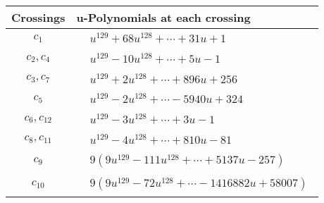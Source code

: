 \documentclass[1p]{elsarticle_modified}
\theoremstyle{definition}
\begin{document}
\begin{tabular}{m{50pt}|m{274pt}}
Crossings & \hspace{64pt}u-Polynomials at each crossing \\
\hline $$\begin{aligned}c_{1}\end{aligned}$$&$\begin{aligned}
&u^{129}+68 u^{128}+\cdots+31 u+1
\end{aligned}$\\
\hline $$\begin{aligned}c_{2},c_{4}\end{aligned}$$&$\begin{aligned}
&u^{129}-10 u^{128}+\cdots+5 u-1
\end{aligned}$\\
\hline $$\begin{aligned}c_{3},c_{7}\end{aligned}$$&$\begin{aligned}
&u^{129}+2 u^{128}+\cdots+896 u+256
\end{aligned}$\\
\hline $$\begin{aligned}c_{5}\end{aligned}$$&$\begin{aligned}
&u^{129}-2 u^{128}+\cdots-5940 u+324
\end{aligned}$\\
\hline $$\begin{aligned}c_{6},c_{12}\end{aligned}$$&$\begin{aligned}
&u^{129}-3 u^{128}+\cdots+3 u-1
\end{aligned}$\\
\hline $$\begin{aligned}c_{8},c_{11}\end{aligned}$$&$\begin{aligned}
&u^{129}-4 u^{128}+\cdots+810 u-81
\end{aligned}$\\
\hline $$\begin{aligned}c_{9}\end{aligned}$$&$\begin{aligned}
&9(9 u^{129}-111 u^{128}+\cdots+5137 u-257)
\end{aligned}$\\
\hline $$\begin{aligned}c_{10}\end{aligned}$$&$\begin{aligned}
&9(9 u^{129}-72 u^{128}+\cdots-1416882 u+58007)
\end{aligned}$\\
\hline
\end{tabular}\\~\\
\end{document}
